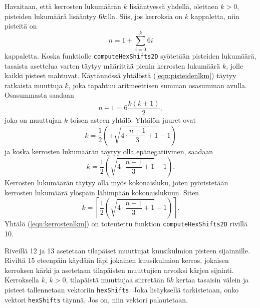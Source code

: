 Havaitaan, että kerrosten lukumäärän $k$ lisääntyessä yhdellä, olettaen $k>0$, pisteiden lukumäärä lisääntyy $6k$:lla. Siis, jos kerroksia on $k$ kappaletta, niin pisteitä on
\begin{equation}\label{eqn:pisteidenlkm}
    n=1+\sum\limits_{i=0}^{k}6i
\end{equation}
kappaletta. Koska funktiolle \texttt{computeHexShifts2D} syötetään pisteiden lukumäärä, tasaista asettelua varten täytyy määrittää pienin kerrosten lukumäärä $k$, jolle kaikki pisteet mahtuvat. Käytännössä yhtälöstä (\ref{eqn:pisteidenlkm}) täytyy ratkaista muuttuja $k$, joka tapahtuu aritmeettisen summan osasumman\cite{harjulehto_analyysia_2022} avulla. Osasummasta saadaan
\begin{equation*}
    n-1=6\frac{k(k+1)}{2},
\end{equation*}
joka on muuttujan $k$ toisen asteen yhtälö. Yhtälön juuret ovat
\begin{equation*}
    k=\frac{1}{2}\left( \pm\sqrt{4\cdot\frac{n - 1}{3} + 1} - 1 \right)
\end{equation*}
ja koska kerrosten lukumäärän täytyy olla epänegatiivinen, saadaan
\begin{equation*}
    k=\frac{1}{2}\left( \sqrt{4\cdot\frac{n - 1}{3} + 1} - 1 \right).
\end{equation*}
Kerrosten lukumäärän täytyy olla myös kokonaisluku, joten pyöristetään kerrosten lukumäärä ylöspäin lähimpään kokonaislukuun. Siten
\begin{equation}\label{eqn:kerrostenlkm}
    k=\left\lceil\frac{1}{2}\left( \sqrt{4\cdot\frac{n - 1}{3} + 1} - 1 \right)\right\rceil.
\end{equation}
Yhtälö (\ref{eqn:kerrostenlkm}) on toteutettu funktion \texttt{computeHexShifts2D} rivillä 10.

Riveillä 12 ja 13 asetetaan tilapäiset muuttujat kuusikulmion pisteen sijainnille. Riviltä 15 eteenpäin käydään läpi jokainen kuusikulmion kerros, jokaisen kerroksen kärki ja asetetaan tilapäisten muuttujien arvoiksi kärjen sijainti. Kerroksella $k$, $k>0$, tilapäistä muuttujaa siirretään $6k$ kertaa tasaisin välein ja pisteet tallennetaan vektoriin \texttt{hexShifts}. Joka lisäyksellä tarkistetaan, onko vektori \texttt{hexShifts} täynnä. Jos on, niin vektori palautetaan.

